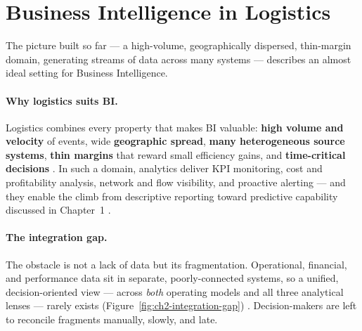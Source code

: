 \section{Business Intelligence in Logistics}
\label{sec:ch2-bi}

The picture built so far --- a high-volume, geographically dispersed, thin-margin domain, generating
streams of data across many systems --- describes an almost ideal setting for Business Intelligence.

\paragraph{Why logistics suits BI.}
Logistics combines every property that makes BI valuable: \textbf{high volume and velocity} of events,
wide \textbf{geographic spread}, \textbf{many heterogeneous source systems}, \textbf{thin margins} that
reward small efficiency gains, and \textbf{time-critical decisions} \parencite{wang2016}. In such a
domain, analytics deliver KPI monitoring, cost and profitability analysis, network and flow visibility,
and proactive alerting --- and they enable the climb from descriptive reporting toward predictive
capability discussed in Chapter~1 \parencite{sharda2020, hofmann2017}.

\paragraph{The integration gap.}
The obstacle is not a lack of data but its fragmentation. Operational, financial, and performance data
sit in separate, poorly-connected systems, so a unified, decision-oriented view --- across \emph{both}
operating models and all three analytical lenses --- rarely exists
(Figure~\ref{fig:ch2-integration-gap}) \parencite{enveyo2025, logisticsviewpoints2026}. Decision-makers
are left to reconcile fragments manually, slowly, and late.

